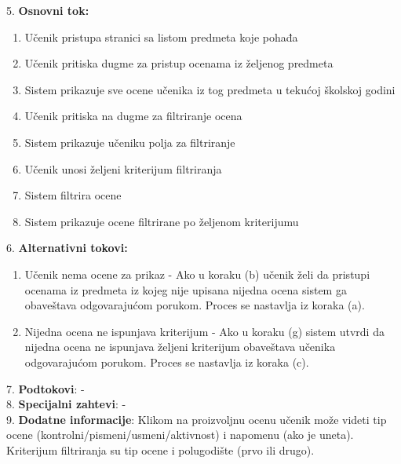 \documentclass{article}
\begin{document}
5. \textbf{Osnovni tok:} 
\begin{enumerate} [label=(\alph*)]
\item Učenik pristupa stranici sa listom predmeta koje pohađa
\item Učenik pritiska dugme za pristup ocenama iz željenog predmeta
\item Sistem prikazuje sve ocene učenika iz tog predmeta u tekućoj školskoj godini
\item Učenik pritiska na dugme za filtriranje ocena
\item Sistem prikazuje učeniku polja za filtriranje
\item Učenik unosi željeni kriterijum filtriranja
\item Sistem filtrira ocene
\item Sistem prikazuje ocene filtrirane po željenom kriterijumu
\end{enumerate}

6. \textbf{Alternativni tokovi:}
\begin{enumerate} [label=(\roman*)]
\item Učenik nema ocene za prikaz - Ako u koraku (b) učenik želi da pristupi ocenama iz predmeta iz kojeg nije upisana nijedna ocena sistem ga obaveštava odgovarajućom porukom. Proces se nastavlja iz koraka (a).
\item Nijedna ocena ne ispunjava kriterijum - Ako u koraku (g) sistem utvrdi da nijedna ocena ne ispunjava željeni kriterijum obaveštava učenika odgovarajućom porukom. Proces se nastavlja iz koraka (c).
\end{enumerate}

7. \textbf{Podtokovi}: - \\

8. \textbf{Specijalni zahtevi}: - \\

9. \textbf{Dodatne informacije}: Klikom na proizvoljnu ocenu učenik može videti tip ocene (kontrolni/pismeni/usmeni/aktivnost) i napomenu (ako je uneta). Kriterijum filtriranja su tip ocene i polugodište (prvo ili drugo). \\
\end{document}
